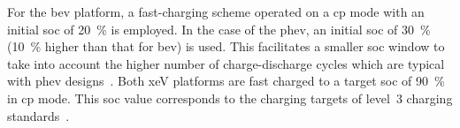For the \gls{bev}  platform, a fast-charging scheme operated on  a \gls{cp} mode
with an initial  \gls{soc} of \SI{20}{\percent} is employed. In  the case of the
\gls{phev}, an initial \gls{soc}  of \SI{30}{\percent} (\SI{10}{\percent} higher
than that for \gls{bev}) is used. This facilitates a smaller \gls{soc} window to
take into account the higher number of charge-discharge cycles which are typical
with \gls{phev} designs~\cite{Maksimovic2012}. Both \gls{xeV} platforms are fast
charged  to a  target  \gls{soc}  of \SI{90}{\percent}  in  \gls{cp} mode.  This
\gls{soc}  value  corresponds  to  the  charging  targets  of  level~3  charging
standards~\cite{SAECharging2011}.



